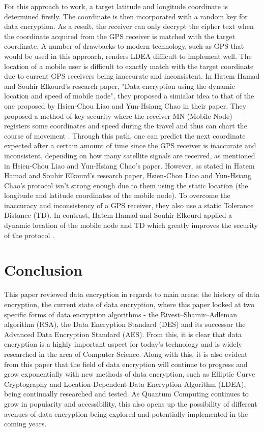 \documentclass[journal]{IEEEtran}
\begin{document}
For this approach to work, a target latitude and longitude coordinate is determined firstly. The coordinate is then incorporated with a random key for data encryption. As a result, the receiver can only decrypt the cipher text when the coordinate acquired from the GPS receiver is matched with the target coordinate. A number of drawbacks to modern technology, such as GPS that would be used in this approach, renders LDEA difficult to implement well. The location of a mobile user is difficult to exactly match with the target coordinate due to current GPS receivers being inaccurate and inconsistent.
\newline\newline
In Hatem Hamad and Souhir Elkourd's research paper, "Data encryption using the dynamic location and speed of mobile node", they proposed a simialar idea to that of the one proposed by Hsien-Chou Liao and Yun-Hsiang Chao in their paper. They proposed a method of key security where the receiver MN (Mobile Node) registers some coordinates and speed during the travel and thus can chart the course of movement \cite{encryption_mobile_node}. Through this path, one can predict the next coordinate expected after a certain amount of time since the GPS receiver is inaccurate and inconsistent, depending on how many satellite signals are received, as mentioned in Hsien-Chou Liao and Yun-Hsiang Chao's paper. However, as stated in Hatem Hamad and Souhir Elkourd's research paper, Hsien-Chou Liao and Yun-Hsiang Chao's protocol isn't strong enough due to them using the static location  (the longitude and latitude coordinates of the mobile node). To overcome the inaccuracy and inconsistency of a GPS receiver, they also use a static Tolerance Distance (TD). In contrast, Hatem Hamad and Souhir Elkourd applied a dynamic location of the mobile node and TD which greatly improves the security of the protocol \cite{encryption_mobile_node}.

\section{\textbf{Conclusion}}
This paper reviewed data encryption in regards to  main areas: the history of data encryption, the current state of data encryption, where this paper looked at two specific forms of data encryption algorithms - the Rivest–Shamir–Adleman algorithm (RSA), the Data Encryption Standard (DES) and its successor the Advanced Data Encryption Standard (AES). From this, it is clear that data encryption is a highly important aspect for today's technology and is widely researched in the area of Computer Science. Along with this, it is also evident from this paper that the field of data encryption will continue to progress and grow exponentially with new methods of data encryption, such as Elliptic Curve Cryptography and Location-Dependent Data Encryption Algorithm (LDEA), being continually researched and tested. As Quantum Computing continues to grow in popularity and accessibility, this also opens up the possibility of different avenues of data encryption being explored and potentially implemented in the coming years.
\end{document}
